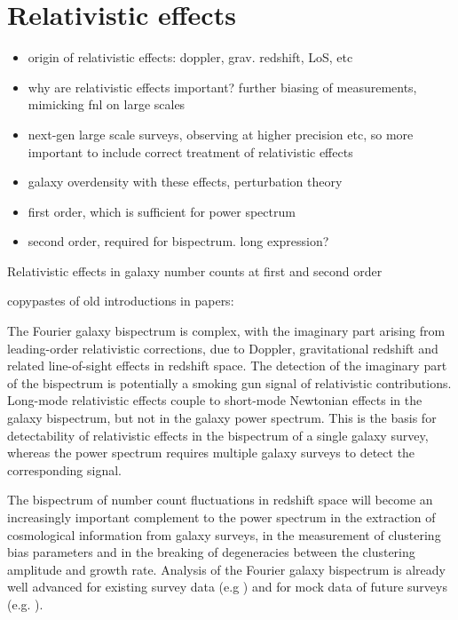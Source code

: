 
\chapter{Relativistic effects}
\label{chapter:introreleff}

\begin{itemize}
	\item origin of relativistic effects: doppler, grav. redshift, LoS, etc
	\item why are relativistic effects important? further biasing of measurements, mimicking fnl on large scales
	\item next-gen large scale surveys, observing at higher precision etc, so more important to include correct treatment of relativistic effects
	\item galaxy overdensity with these effects, perturbation theory
	\item first order, which is sufficient for power spectrum
	\item second order, required for bispectrum. long expression? 
\end{itemize}


Relativistic effects in galaxy number counts at first and second order

copypastes of old introductions in papers:

The Fourier galaxy bispectrum is complex, with the imaginary part arising from leading-order relativistic corrections, due to Doppler, gravitational redshift  and related line-of-sight effects  in redshift space. The detection of the imaginary  part of the bispectrum is potentially a smoking gun signal of relativistic contributions. Long-mode relativistic effects couple to  short-mode Newtonian effects in the galaxy bispectrum, but not in the galaxy power spectrum. This is  the basis for detectability of relativistic effects in the bispectrum of a single galaxy survey, whereas the power spectrum requires multiple galaxy surveys to detect the corresponding signal.

The bispectrum of number count fluctuations in redshift space will become an increasingly important complement to the power spectrum in the extraction of cosmological information from galaxy surveys, 
{in the measurement of {clustering} bias parameters and in the breaking of degeneracies between the clustering amplitude and growth rate.}
Analysis of the Fourier galaxy bispectrum is already well advanced for existing survey data (e.g \cite{Gil-Marin:2016wya,Sugiyama:2018yzo}) and for mock data of future surveys (e.g. \cite{Karagiannis:2018jdt,Yankelevich:2018uaz,Oddo:2019run,Sugiyama:2019ike}). 

